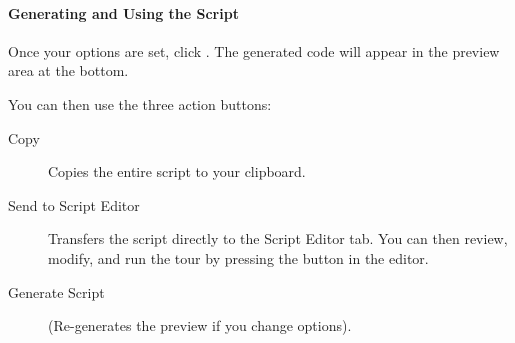 \paragraph{Generating and Using the Script}
Once your options are set, click . The generated  code will appear in the preview area at the bottom.

You can then use the three action buttons:
\begin{description}
\item[Copy] Copies the entire script to your clipboard.
\item[Send to Script Editor] Transfers the script directly to the Script Editor tab. You can then review, modify, and run the tour by pressing the  button in the editor.
\item[Generate Script] (Re-generates the preview if you change options).
\end{description}